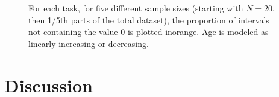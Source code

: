 \documentclass[
  letterpaper,
  DIV=11,
  numbers=noendperiod]{scrartcl}
\begin{document}
\begin{figure}


\caption{\label{fig-4}For each task, for five different sample sizes
(starting with \(N=20\), then 1/5th parts of the total dataset), the
proportion of intervals not containing the value 0 is plotted inorange.
Age is modeled as linearly increasing or decreasing.}

\end{figure}%

\section{Discussion}\label{discussion}
\end{document}
